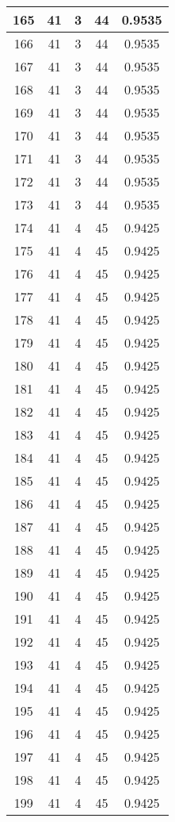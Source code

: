 \documentclass[letterpaper, 12pt]{article}
\begin{document}
\begin{longtable}{|c|c|c|c|c|}
\hline
165 & 41 & 3 & 44 & 0.9535 \\
\hline
166 & 41 & 3 & 44 & 0.9535 \\
\hline
167 & 41 & 3 & 44 & 0.9535 \\
\hline
168 & 41 & 3 & 44 & 0.9535 \\
\hline
169 & 41 & 3 & 44 & 0.9535 \\
\hline
170 & 41 & 3 & 44 & 0.9535 \\
\hline
171 & 41 & 3 & 44 & 0.9535 \\
\hline
172 & 41 & 3 & 44 & 0.9535 \\
\hline
173 & 41 & 3 & 44 & 0.9535 \\
\hline
174 & 41 & 4 & 45 & 0.9425 \\
\hline
175 & 41 & 4 & 45 & 0.9425 \\
\hline
176 & 41 & 4 & 45 & 0.9425 \\
\hline
177 & 41 & 4 & 45 & 0.9425 \\
\hline
178 & 41 & 4 & 45 & 0.9425 \\
\hline
179 & 41 & 4 & 45 & 0.9425 \\
\hline
180 & 41 & 4 & 45 & 0.9425 \\
\hline
181 & 41 & 4 & 45 & 0.9425 \\
\hline
182 & 41 & 4 & 45 & 0.9425 \\
\hline
183 & 41 & 4 & 45 & 0.9425 \\
\hline
184 & 41 & 4 & 45 & 0.9425 \\
\hline
185 & 41 & 4 & 45 & 0.9425 \\
\hline
186 & 41 & 4 & 45 & 0.9425 \\
\hline
187 & 41 & 4 & 45 & 0.9425 \\
\hline
188 & 41 & 4 & 45 & 0.9425 \\
\hline
189 & 41 & 4 & 45 & 0.9425 \\
\hline
190 & 41 & 4 & 45 & 0.9425 \\
\hline
191 & 41 & 4 & 45 & 0.9425 \\
\hline
192 & 41 & 4 & 45 & 0.9425 \\
\hline
193 & 41 & 4 & 45 & 0.9425 \\
\hline
194 & 41 & 4 & 45 & 0.9425 \\
\hline
195 & 41 & 4 & 45 & 0.9425 \\
\hline
196 & 41 & 4 & 45 & 0.9425 \\
\hline
197 & 41 & 4 & 45 & 0.9425 \\
\hline
198 & 41 & 4 & 45 & 0.9425 \\
\hline
199 & 41 & 4 & 45 & 0.9425 \\
\hline
\end{longtable}
\end{document}
